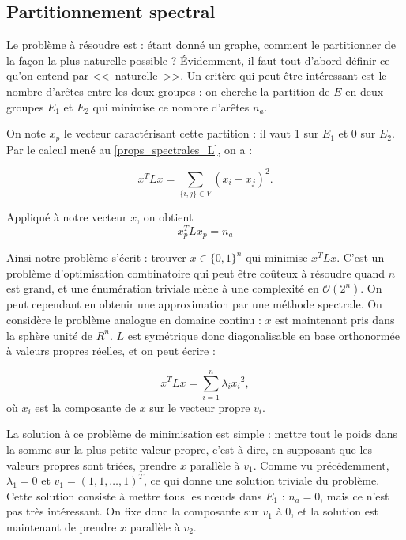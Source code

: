\documentclass[12pt]{article}
\begin{document}
\subsection{Partitionnement spectral}
Le problème à résoudre est : étant donné un graphe, comment le
partitionner de la façon la plus naturelle possible ? Évidemment, il
faut tout d'abord définir ce qu'on entend par <<~naturelle~>>. Un
critère qui peut être intéressant est le nombre d'arêtes entre les
deux groupes : on cherche la partition de $E$ en deux groupes $E_1$ et
$E_2$ qui minimise ce nombre d'arêtes $n_a$.

On note $x_p$ le vecteur caractérisant cette partition : il vaut 1 sur
$E_1$ et 0 sur $E_2$. Par le calcul mené au \ref{props_spectrales_L},
on a :

\begin{equation}
 x^T L x = \sum_{\{i, j\} \in V} (x_i - x_j)^2.
\end{equation}

Appliqué à notre vecteur $x$, on obtient
\begin{equation}
 x_p^T L x_p = n_a
\end{equation}

Ainsi notre problème s'écrit : trouver $x \in \{0,1\}^n$ qui
minimise $x^T L x$. C'est un problème d'optimisation combinatoire
qui peut être coûteux à résoudre quand $n$ est grand, et une
énumération triviale mène à une complexité en $\mathcal O (2^n)$. On peut
cependant en obtenir une approximation par une méthode spectrale. On
considère le problème analogue en domaine continu : $x$ est
maintenant pris dans la sphère unité de $R^n$. $L$ est symétrique donc
diagonalisable en base orthonormée à valeurs propres réelles, et on
peut écrire :

\begin{equation}
 x^T L x = \sum_{i=1}^n \lambda_i {x_i}^2,
\end{equation}
où $x_i$ est la composante de $x$ sur le vecteur propre $v_i$.

La solution à ce problème de minimisation est simple : mettre tout le
poids dans la somme sur la plus petite valeur propre, c'est-à-dire, en
supposant que les valeurs propres sont triées, prendre $x$ parallèle à
$v_1$. Comme vu précédemment, $\lambda_1 = 0$ et $v_1 = (1, 1, \dots,
1)^T$, ce qui donne une solution triviale du problème. Cette solution
consiste à mettre tous les n\oe uds dans $E_1$ : $n_a = 0$, mais ce
n'est pas très intéressant. On fixe donc la composante sur $v_1$ à 0,
et la solution est maintenant de prendre $x$ parallèle à $v_2$.
\end{document}
